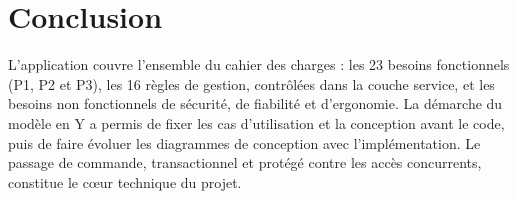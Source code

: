 \chapter{Conclusion}

L'application couvre l'ensemble du cahier des charges : les 23 besoins fonctionnels (P1, P2 et P3), les
16 règles de gestion, contrôlées dans la couche service, et les besoins non fonctionnels de sécurité, de
fiabilité et d'ergonomie. La démarche du modèle en Y a permis de fixer les cas d'utilisation et la
conception avant le code, puis de faire évoluer les diagrammes de conception avec l'implémentation.
Le passage de commande, transactionnel et protégé contre les accès concurrents, constitue le cœur
technique du projet.
